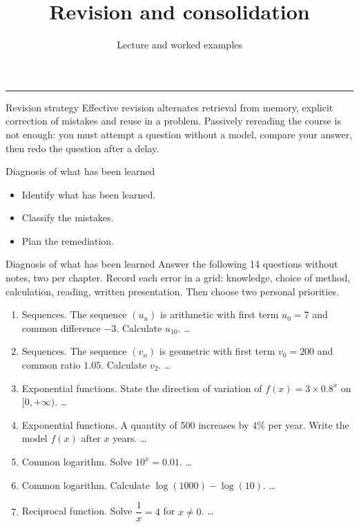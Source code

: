 \documentclass[aspectratio=169,10pt]{beamer}
\title{Revision and consolidation}
\subtitle{Lecture and worked examples}
\date{}
\author{}
\begin{document}
\begin{frame}[plain]
\vfill
{\inserttitle\par}
\medskip
{\insertsubtitle\par}
\medskip
{\rule{\textwidth}{.5pt}}
\vfill
\end{frame}
\begin{frame}{Revision strategy}
Effective revision alternates retrieval from memory, explicit correction of mistakes and reuse in a problem. Passively rereading the course is not enough: you must attempt a question without a model, compare your answer, then redo the question after a delay.
\end{frame}
\begin{frame}{Diagnosis of what has been learned}
\begin{itemize}
\item Identify what has been learned.
\item Classify the mistakes.
\item Plan the remediation.

\end{itemize}
\end{frame}
\begin{frame}{Diagnosis of what has been learned}
Answer the following 14 questions without notes, two per chapter. Record each error in a grid: knowledge, choice of method, calculation, reading, written presentation. Then choose two personal priorities.

\begin{enumerate}
\setcounter{enumi}{0}\item Sequences. The sequence \((u_n)\) is arithmetic with first term \(u_0=7\) and common difference \(-3\). Calculate \(u_{10}\). \ldots{}

\item Sequences. The sequence \((v_n)\) is geometric with first term \(v_0=200\) and common ratio \(1.05\). Calculate \(v_2\). \ldots{}

\item Exponential functions. State the direction of variation of \(f(x)=3\times0.8^x\) on \([0,+\infty)\). \ldots{}

\item Exponential functions. A quantity of 500 increases by \(4\%\) per year. Write the model \(f(x)\) after \(x\) years. \ldots{}

\item Common logarithm. Solve \(10^x=0.01\). \ldots{}

\item Common logarithm. Calculate \(\log(1000)-\log(10)\). \ldots{}

\item Reciprocal function. Solve \(\dfrac1x=4\) for \(x\neq0\). \ldots{}

\end{enumerate}
\end{frame}
\end{document}
